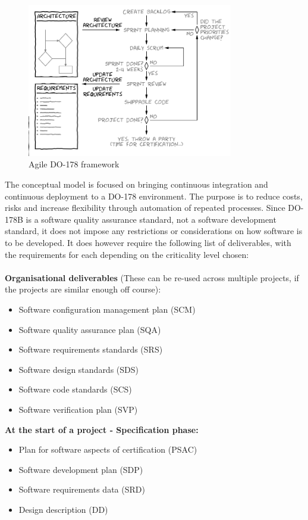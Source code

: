 \documentclass{sig-alternate-05-2015}
\begin{document}
\begin{figure}[t!]
	\centering 
	\includegraphics[width=90mm]{DO178_scrum.png}
	\caption{Agile DO-178 framework}
\end{figure}

The conceptual model is focused on bringing continuous integration and continuous deployment to a DO-178 environment. The purpose is to reduce costs, risks and increase flexibility through automation of repeated processes. Since DO-178B is a software quality assurance standard, not a software development standard, it does not impose any restrictions or considerations on how software is to be developed. It does however require the following list of deliverables, with the requirements for each depending on the criticality level chosen:
\\
\\
\textbf{Organisational deliverables}
(These can be re-used across multiple projects, if the projects are similar enough off course):

\begin{itemize}
	\item Software configuration management plan (SCM)
	\item Software quality assurance plan (SQA)
	\item Software requirements standards (SRS)
	\item Software design standards (SDS)
	\item Software code standards (SCS)
	\item Software verification plan (SVP)
\end{itemize}

\hfill \break
\textbf{At the start of a project - Specification phase:}

\begin{itemize}
	\item Plan for software aspects of certification (PSAC)
	\item Software development plan (SDP)
	\item Software requirements data (SRD)
	\item Design description (DD)
\end{itemize}
\end{document}
